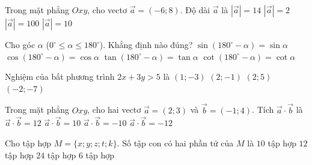 

\begin{ex}%
	Trong mặt phẳng $Oxy$, cho vectơ $\vec{a}=(-6;8)$. Độ dài $\vec{a}$ là
	\choice
		{$|\vec{a}|=14$}
		{$|\vec{a}|=2$}
		{$|\vec{a}|=100$}
		{\True $|\vec{a}|=10$}
\end{ex}

\begin{ex}%
	Cho góc $\alpha$ ($0^\circ \le \alpha \le 180^\circ$). Khẳng định nào đúng?
	\choice
		{\True $\sin(180^\circ-\alpha)=\sin\alpha$}
		{$\cos(180^\circ-\alpha)=\cos\alpha$}
		{$\tan(180^\circ-\alpha)=\tan\alpha$}
		{$\cot(180^\circ-\alpha)=\cot\alpha$}
\end{ex}

\begin{ex}%
	Nghiệm của bất phương trình $2x+3y>5$ là
	\choice
		{$(1;-3)$}
		{$(2;-1)$}
		{\True $(2;5)$}
		{$(-2;-7)$}
\end{ex}

\begin{ex}%
	Trong mặt phẳng $Oxy$, cho hai vectơ $\vec{a}=(2;3)$ và $\vec{b}=(-1;4)$. Tích $\vec{a}\cdot\vec{b}$ là
	\choice
		{$\vec{a}\cdot\vec{b}=12$}
		{\True $\vec{a}\cdot\vec{b}=10$}
		{$\vec{a}\cdot\vec{b}=-10$}
		{$\vec{a}\cdot\vec{b}=-12$}
\end{ex}

\begin{ex}%
	Cho tập hợp $M=\{x;y;z;t;k\}$. Số tập con có hai phần tử của $M$ là
	\choice
		{\True $10$ tập hợp}
		{$12$ tập hợp}
		{$24$ tập hợp}
		{$6$ tập hợp}
\end{ex}

